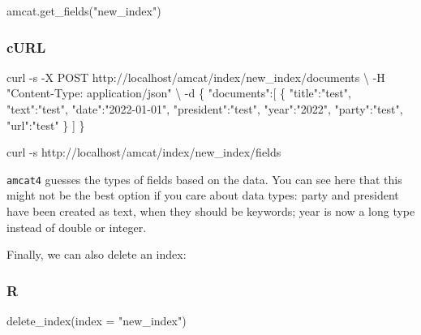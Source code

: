 \documentclass[
  letterpaper,
  DIV=11,
  numbers=noendperiod]{scrreprt}
\newenvironment{Shaded}{\begin{snugshade}}{\end{snugshade}}
\newcommand{\AttributeTok}[1]{\textcolor[rgb]{0.40,0.45,0.13}{#1}}
\newcommand{\DataTypeTok}[1]{\textcolor[rgb]{0.68,0.00,0.00}{#1}}
\newcommand{\ExtensionTok}[1]{\textcolor[rgb]{0.00,0.23,0.31}{#1}}
\newcommand{\FunctionTok}[1]{\textcolor[rgb]{0.28,0.35,0.67}{#1}}
\newcommand{\NormalTok}[1]{\textcolor[rgb]{0.00,0.23,0.31}{#1}}
\newcommand{\StringTok}[1]{\textcolor[rgb]{0.13,0.47,0.30}{#1}}
\begin{document}
\begin{Shaded}
\begin{Highlighting}[]
\NormalTok{amcat.get\_fields(}\StringTok{"new\_index"}\NormalTok{)}
\end{Highlighting}
\end{Shaded}

\subsubsection{cURL}

\begin{Shaded}
\begin{Highlighting}[]
\ExtensionTok{curl} \AttributeTok{{-}s} \AttributeTok{{-}X}\NormalTok{ POST http://localhost/amcat/index/new\_index/documents }\DataTypeTok{\textbackslash{}}
  \AttributeTok{{-}H} \StringTok{"Content{-}Type: application/json"} \DataTypeTok{\textbackslash{}}
  \AttributeTok{{-}d} \StringTok{\textquotesingle{}\{}
\StringTok{         "documents":[}
\StringTok{            \{}
\StringTok{               "title":"test",}
\StringTok{               "text":"test",}
\StringTok{               "date":"2022{-}01{-}01",}
\StringTok{               "president":"test",}
\StringTok{               "year":"2022",}
\StringTok{               "party":"test",}
\StringTok{               "url":"test"}
\StringTok{            \}}
\StringTok{         ]}
\StringTok{      \}\textquotesingle{}}
\end{Highlighting}
\end{Shaded}

\begin{Shaded}
\begin{Highlighting}[]
\ExtensionTok{curl} \AttributeTok{{-}s}\NormalTok{ http://localhost/amcat/index/new\_index/fields}
\end{Highlighting}
\end{Shaded}

\texttt{amcat4} guesses the types of fields based on the data. You can
see here that this might not be the best option if you care about data
types: party and president have been created as text, when they should
be keywords; year is now a long type instead of double or integer.

Finally, we can also delete an index:

\subsubsection{R}

\begin{Shaded}
\begin{Highlighting}[]
\FunctionTok{delete\_index}\NormalTok{(}\AttributeTok{index =} \StringTok{"new\_index"}\NormalTok{)}
\end{Highlighting}
\end{Shaded}
\end{document}
